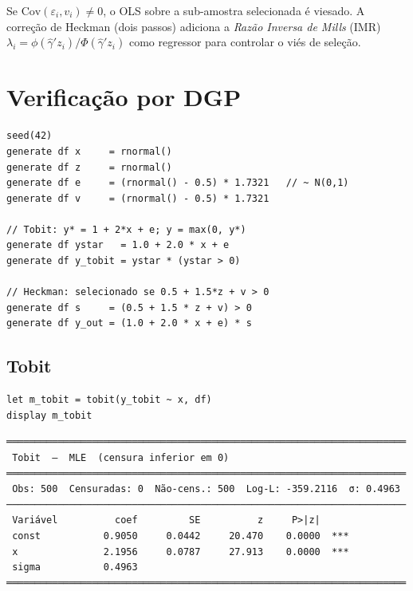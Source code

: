 Se $\mathrm{Cov}(\varepsilon_i, v_i) \neq 0$, o OLS sobre a sub-amostra
selecionada é viesado. A correção de Heckman (dois passos) adiciona a
\emph{Razão Inversa de Mills} (IMR) $\lambda_i = \phi(\hat\gamma'z_i)/\Phi(\hat\gamma'z_i)$
como regressor para controlar o viés de seleção.

\section{Verificação por DGP}

\begin{lstlisting}[caption={DGP Tobit e Heckman}]
seed(42)
generate df x     = rnormal()
generate df z     = rnormal()
generate df e     = (rnormal() - 0.5) * 1.7321   // ~ N(0,1)
generate df v     = (rnormal() - 0.5) * 1.7321

// Tobit: y* = 1 + 2*x + e; y = max(0, y*)
generate df ystar   = 1.0 + 2.0 * x + e
generate df y_tobit = ystar * (ystar > 0)

// Heckman: selecionado se 0.5 + 1.5*z + v > 0
generate df s     = (0.5 + 1.5 * z + v) > 0
generate df y_out = (1.0 + 2.0 * x + e) * s
\end{lstlisting}

\subsection*{Tobit}

\begin{lstlisting}
let m_tobit = tobit(y_tobit ~ x, df)
display m_tobit
\end{lstlisting}

\begin{lstlisting}[language={}, basicstyle=\ttfamily\small,
  frame=none, numbers=none, backgroundcolor=\color{codbg},
  xleftmargin=0pt, xrightmargin=0pt, breaklines=false]
══════════════════════════════════════════════════════════════════════
 Tobit  —  MLE  (censura inferior em 0)
══════════════════════════════════════════════════════════════════════
 Obs: 500  Censuradas: 0  Não-cens.: 500  Log-L: -359.2116  σ: 0.4963
──────────────────────────────────────────────────────────────────────
 Variável          coef         SE          z     P>|z|
 const           0.9050     0.0442     20.470    0.0000  ***
 x               2.1956     0.0787     27.913    0.0000  ***
 sigma           0.4963
══════════════════════════════════════════════════════════════════════
\end{lstlisting}

